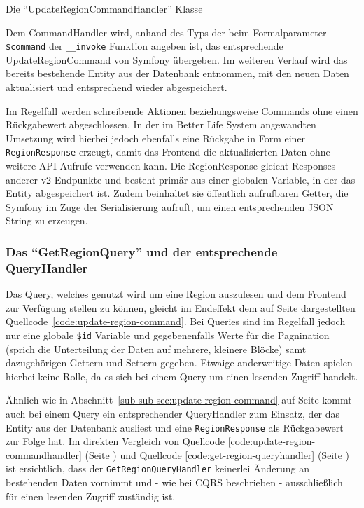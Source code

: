 \documentclass[a4paper,12pt,twoside]{scrreprt}
\begin{document}
\pagebreak

\begin{listing}[ht]
    \inputminted[fontsize=\footnotesize,linenos,breaklines]{php}{code/update_region_commandhandler.php}
    \caption[Die \enquote{UpdateRegionCommandHandler} Klasse]{Die \enquote{UpdateRegionCommandHandler} Klasse}
    \label{code:update-region-commandhandler}
\end{listing}

Dem CommandHandler wird, anhand des Typs der beim Formalparameter \texttt{\$command} der \texttt{\_\_invoke} Funktion angeben ist, das entsprechende UpdateRegionCommand von Symfony übergeben. Im weiteren Verlauf wird das bereits bestehende Entity aus der Datenbank entnommen, mit den neuen Daten aktualisiert und entsprechend wieder abgespeichert.

Im Regelfall werden schreibende Aktionen beziehungsweise Commands ohne einen Rückgabewert abgeschlossen. \parencite[]{fowler_commandqueryseparation_2005} In der im Better Life System angewandten Umsetzung wird hierbei jedoch ebenfalls eine Rückgabe in Form einer \texttt{RegionResponse} erzeugt, damit das Frontend die aktualisierten Daten ohne weitere API Aufrufe verwenden kann. Die RegionResponse gleicht Responses anderer v2 Endpunkte und besteht primär aus einer globalen Variable, in der das Entity abgespeichert ist. Zudem beinhaltet sie öffentlich aufrufbaren Getter, die Symfony im Zuge der Serialisierung aufruft, um einen entsprechenden JSON String zu erzeugen.

\subsubsection{Das \enquote{GetRegionQuery} und der entsprechende QueryHandler}
\label{sub-sub-sec:get-region-query}
Das Query, welches genutzt wird um eine Region auszulesen und dem Frontend zur Verfügung stellen zu können, gleicht im Endeffekt dem auf Seite \pageref{code:update-region-command} dargestellten Quellcode~\ref{code:update-region-command}. Bei Queries sind im Regelfall jedoch nur eine globale \texttt{\$id} Variable und gegebenenfalls Werte für die Pagnination (sprich die Unterteilung der Daten auf mehrere, kleinere Blöcke) samt dazugehörigen Gettern und Settern gegeben. Etwaige anderweitige Daten spielen hierbei keine Rolle, da es sich bei einem Query um einen lesenden Zugriff handelt.

\medskip

Ähnlich wie in Abschnitt~\ref{sub-sub-sec:update-region-command} auf Seite \pageref{sub-sub-sec:update-region-command} kommt auch bei einem Query ein entsprechender QueryHandler zum Einsatz, der das Entity aus der Datenbank ausliest und eine \texttt{RegionResponse} als Rückgabewert zur Folge hat. Im direkten Vergleich von Quellcode \ref{code:update-region-commandhandler} (Seite \pageref{code:update-region-commandhandler}) und Quellcode \ref{code:get-region-queryhandler} (Seite \pageref{code:get-region-queryhandler}) ist ersichtlich, dass der \texttt{GetRegionQueryHandler} keinerlei Änderung an bestehenden Daten vornimmt und - wie bei CQRS beschrieben - ausschließlich für einen lesenden Zugriff zuständig ist.
\end{document}
